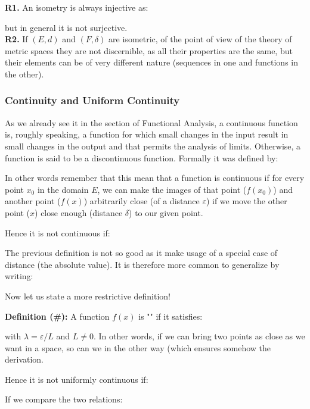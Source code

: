 	\begin{tcolorbox}[title=Remarks,colframe=black,arc=10pt]
	\textbf{R1.} An isometry is always injective as:
	
	but in general it is not surjective.\\
	
	\textbf{R2.} If $(E,d)$ and $(F,\delta)$ are isometric, of the point of view of the theory of metric spaces they are not discernible, as all their properties are the same, but their elements can be  of very different nature (sequences in one and functions in the other).\\
	\end{tcolorbox}
	
	\pagebreak
	\subsubsection{Continuity and Uniform Continuity}\label{continuity and uniform continuity}
	As we already see it in the section of Functional Analysis, a continuous function is, roughly speaking, a function for which small changes in the input result in small changes in the output and that permits the analysis of limits. Otherwise, a function is said to be a discontinuous function. Formally it was defined by:
	
	In other words remember that this mean that a function is continuous if for every point $x_0$ in the domain $E$, we can make the images of that point ($f(x_0)$) and another point ($f(x)$) arbitrarily close (of a distance $\varepsilon$) if we move the other point ($x$) close enough (distance $\delta$) to our given point.
	
	Hence it is not continuous if:
	
	
	The previous definition is not so good as it make usage of a special case of distance (the absolute value). It is therefore more common to generalize by writing:
	
	
	Now let us state a more restrictive definition!
	
	\textbf{Definition (\#\mydef):} A function $f(x)$ is "" if it satisfies:
	
	with $\lambda=\varepsilon/L$ and $L\neq 0$. In other words, if we can bring two points as close as we want in a space, so can we in the other way (which ensures somehow the derivation.
	
	Hence it is not uniformly continuous if:
	
	
	If we compare the two relations:
	
